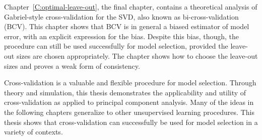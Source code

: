 Chapter~\ref{C:optimal-leave-out}, the final chapter, contains a theoretical analysis of Gabriel-style cross-validation for the SVD, also known as bi-cross-validation (BCV).  This chapter shows that BCV is in general a biased estimator of model error, with an explicit expression for the bias.  Despite this bias, though, the procedure can still be used successfully for model selection, provided the leave-out sizes are chosen appropriately.  The chapter shows how to choose the leave-out sizes and proves a weak form of consistency.

Cross-validation is a valuable and flexible procedure for model selection.  Through theory and simulation, this thesis demonstrates the applicability and utility of cross-validation as applied to principal component analysis.  Many of the ideas in the following chapters generalize to other unsupervised learning procedures.  This thesis shows that cross-validation can successfully be used for model selection in a variety of contexts.
